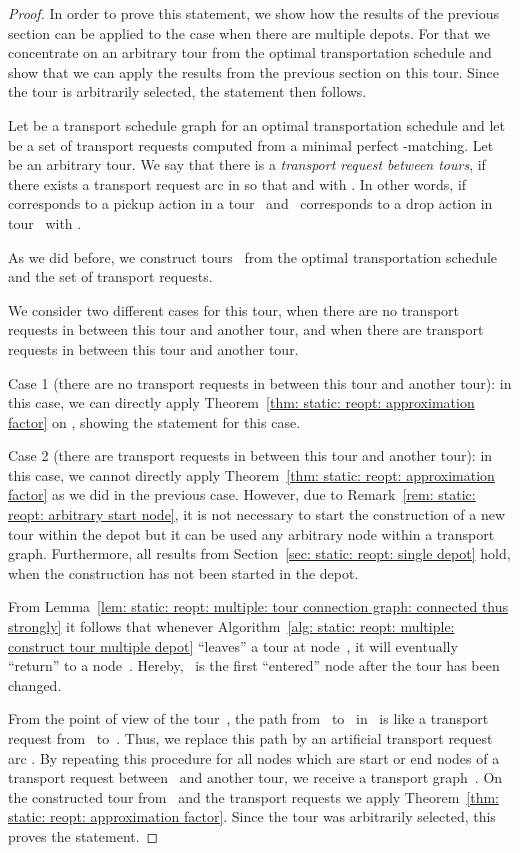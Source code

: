 \documentclass[english]{llncs}
\numberwithin{sublemma}{lemma}
\begin{document}
\begin{proof}
In order to prove this statement, we show how the results of the previous section can be applied to the case when there are multiple depots.
For that we concentrate on an arbitrary tour from the optimal transportation schedule and show that we can apply the results from the previous section on this tour.
Since the tour is arbitrarily selected, the statement then follows.


Let  be a transport schedule graph for an optimal transportation schedule  and let  be a set of transport requests computed from a minimal perfect -matching.
Let  be an arbitrary tour.
We say that there is a \emph{transport request between tours}, if there exists a transport request arc  in  so that  and  with .
In other words, if~ corresponds to a pickup action in a tour~ and~ corresponds to a drop action in tour~ with .

As we did before, we construct tours~ from the optimal transportation schedule and the set of transport requests.

We consider two different cases for this tour, when there are no transport requests in  between this tour and another tour,
and when there are transport requests in  between this tour and another tour.


Case 1 (there are no transport requests in  between this tour and another tour):
in this case, we can directly apply Theorem~\ref{thm: static: reopt: approximation factor} on , showing the statement for this case.

Case 2 (there are transport requests in  between this tour and another tour):
in this case, we cannot directly apply Theorem~\ref{thm: static: reopt: approximation factor} as we did in the previous case. 
However, due to Remark~\ref{rem: static: reopt: arbitrary start node}, it is not necessary to start the construction of a new tour within the depot but it can be used any arbitrary node within a transport graph.
Furthermore, all results from Section~\ref{sec: static: reopt: single depot} hold, when the construction has not been started in the depot.

From Lemma~\ref{lem: static: reopt: multiple: tour connection graph: connected thus strongly} it follows that whenever Algorithm~\ref{alg: static: reopt: multiple: construct tour multiple depot}
``leaves'' a tour at node~, it will eventually ``return'' to a node~.
Hereby,~ is the first ``entered'' node after the tour has been changed.

From the point of view of the tour~, the path from~ to~ in~ is like a transport request from~ to~.
Thus, we replace this path by an artificial transport request arc .
By repeating this procedure for all nodes which are start or end nodes of a transport request between~ and another tour, we receive a transport graph~.
On the constructed tour from~ and the transport requests we apply Theorem~\ref{thm: static: reopt: approximation factor}.
Since the tour was arbitrarily selected, this proves the statement.
\end{proof}
\end{document}
